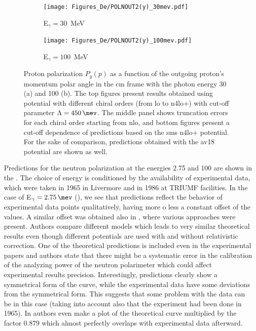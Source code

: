     \begin{figure}[h]
        \centering
        \begin{subfigure}[b]{0.46\textwidth}
            \caption{\small E$_\gamma = 30$~MeV}
            \texttt{[image: Figures\_De/POLNOUT2(y)\_30mev.pdf]}
            \label{PY_30_vert}
        \end{subfigure}
        \begin{subfigure}[b]{0.46\textwidth}
            \caption{\small E$_\gamma = 100$~MeV}
            \texttt{[image: Figures\_De/POLNOUT2(y)\_100mev.pdf]}
            \label{PY_100_vert}
        \end{subfigure}
        \caption{Proton polarization $P_y(p)$ 
        \label{PY_30_100_vert}
        as a function of the outgoing proton's momentum polar angle in the \gls{cm} frame 
        with the photon energy \SI{30}{\mev} (a) and \SI{100}{\mev} (b).
        The top figures present results obtained using potential
        with different chiral orders (from \gls{lo} to \gls{n4lo+}) with cut-off parameter $\Lambda=\SI{450}{\mev}$.
        The middle panel shows truncation errors for each 
        chiral order starting from \gls{nlo}, and
        bottom figures present a cut-off dependence of predictions
        based on the \gls{sms} \gls{n4lo+} potential.
        For the sake of comparison, predictions obtained with the \gls*{av18} potential 
        are shown as well.}
    \end{figure}



    Predictions for the neutron polarization at the energies \SI{2.75}{\mev} and \SI{100}{\mev} are shown in the
    . The choice of energy is conditioned by the availability of experimental data,
    which were taken in 1965 in Livermore \cite{Jewell_neuteronpolarization} and 
    in 1986 at TRIUMF \cite{CAMERON_neuteronpolarization} facilities.
    In the case of E$_\gamma = \SI{2.75}{\mev}$ (), we see that predictions reflect
    the behavior of experimental data points qualitatively,
    having more o less a constant offset of the values. A similar offset was obtained
    also in \cite{ArenhovelPhotodisint1991}, where various approaches were present.
    Authors compare different models which leads to very similar theoretical results
    even though different potentials are used with and without relativistic correction.
    One of the theoretical predictions is included even in the experimental papers
    \cite{Jewell_neuteronpolarization} and authors state that there might be a
    systematic error in the calibration of the analyzing power
    of the neutron polarimeter which could affect experimental results precision.
    Interestingly, predictions clearly show a symmetrical form of the curve, while the experimental data
    have some deviations from the symmetrical form. This suggests that some problem with the data can be
    in this case (taking into account also that the experiment had been done in 1965).
    In \cite{Jewell_neuteronpolarization} authors even make a plot of the theoretical curve
    multiplied by the factor 0.879 which almost perfectly overlaps with experimental data afterward. 

